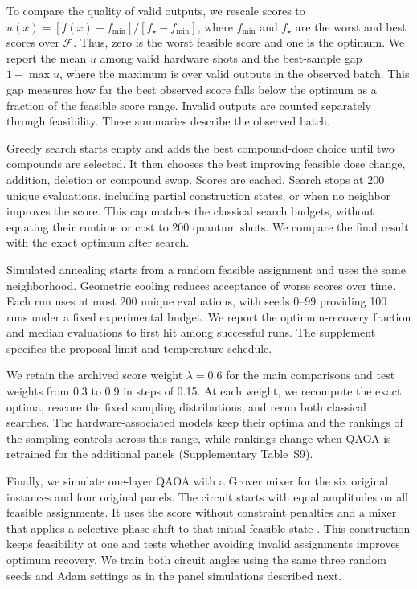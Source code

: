 \documentclass[utf8]{FrontiersinHarvard}
\newcommand{\Fset}{\mathcal{F}}
\begin{document}
To compare the quality of valid outputs, we rescale scores to $u(x)=[f(x)-f_{\min}]/[f_\star-f_{\min}]$, where $f_{\min}$ and $f_\star$ are the worst and best scores over $\Fset$. Thus, zero is the worst feasible score and one is the optimum. We report the mean $u$ among valid hardware shots and the best-sample gap $1-\max u$, where the maximum is over valid outputs in the observed batch. This gap measures how far the best observed score falls below the optimum as a fraction of the feasible score range. Invalid outputs are counted separately through feasibility. These summaries describe the observed batch.

Greedy search starts empty and adds the best compound-dose choice until two compounds are selected. It then chooses the best improving feasible dose change, addition, deletion or compound swap. Scores are cached. Search stops at 200 unique evaluations, including partial construction states, or when no neighbor improves the score. This cap matches the classical search budgets, without equating their runtime or cost to 200 quantum shots. We compare the final result with the exact optimum after search.

Simulated annealing starts from a random feasible assignment and uses the same neighborhood. Geometric cooling reduces acceptance of worse scores over time. Each run uses at most 200 unique evaluations, with seeds 0--99 providing 100 runs under a fixed experimental budget. We report the optimum-recovery fraction and median evaluations to first hit among successful runs. The supplement specifies the proposal limit and temperature schedule.

We retain the archived score weight $\lambda=0.6$ for the main comparisons and test weights from 0.3 to 0.9 in steps of 0.15. At each weight, we recompute the exact optima, rescore the fixed sampling distributions, and rerun both classical searches. The hardware-associated models keep their optima and the rankings of the sampling controls across this range, while rankings change when QAOA is retrained for the additional panels (Supplementary Table~S9).

Finally, we simulate one-layer QAOA with a Grover mixer for the six original instances and four original panels. The circuit starts with equal amplitudes on all feasible assignments. It uses the score without constraint penalties and a mixer that applies a selective phase shift to that initial feasible state \citep{bartschi2020}. This construction keeps feasibility at one and tests whether avoiding invalid assignments improves optimum recovery. We train both circuit angles using the same three random seeds and Adam settings as in the panel simulations described next.
\end{document}
